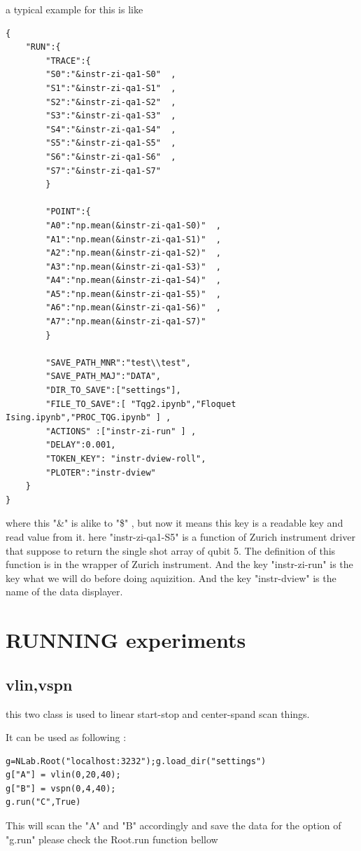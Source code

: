\documentclass{article}
\begin{document}
a typical example for this is like 
\begin{lstlisting}
{
	"RUN":{
		"TRACE":{
        "S0":"&instr-zi-qa1-S0"  ,
        "S1":"&instr-zi-qa1-S1"  ,
        "S2":"&instr-zi-qa1-S2"  ,
        "S3":"&instr-zi-qa1-S3"  ,
        "S4":"&instr-zi-qa1-S4"  ,
        "S5":"&instr-zi-qa1-S5"  ,
        "S6":"&instr-zi-qa1-S6"  ,
        "S7":"&instr-zi-qa1-S7"
		}
   
		"POINT":{
        "A0":"np.mean(&instr-zi-qa1-S0)"  ,
        "A1":"np.mean(&instr-zi-qa1-S1)"  ,
        "A2":"np.mean(&instr-zi-qa1-S2)"  ,
        "A3":"np.mean(&instr-zi-qa1-S3)"  ,
        "A4":"np.mean(&instr-zi-qa1-S4)"  ,
        "A5":"np.mean(&instr-zi-qa1-S5)"  ,
        "A6":"np.mean(&instr-zi-qa1-S6)"  ,
        "A7":"np.mean(&instr-zi-qa1-S7)"
		}

		"SAVE_PATH_MNR":"test\\test",
		"SAVE_PATH_MAJ":"DATA",
		"DIR_TO_SAVE":["settings"],
		"FILE_TO_SAVE":[ "Tqg2.ipynb","Floquet Ising.ipynb","PROC_TQG.ipynb" ] ,
		"ACTIONS" :["instr-zi-run" ] ,
		"DELAY":0.001,
		"TOKEN_KEY": "instr-dview-roll",
		"PLOTER":"instr-dview"
	}
}
\end{lstlisting}
where this "\&"  is alike to "\$" , but now it means 
this key is a readable key and read value from it.
here "instr-zi-qa1-S5" is a function of Zurich instrument driver
that suppose to return the single shot array of qubit 5.
The definition of this function is in the wrapper of Zurich instrument.
And the key "instr-zi-run" is the key what we will do before
doing aquizition.
And the key "instr-dview" is the name of the data displayer.





\section{RUNNING experiments}
\subsection{vlin,vspn}
this two class is used to linear start-stop and center-spand scan things.

It can be used as following : 

\begin{lstlisting}
g=NLab.Root("localhost:3232");g.load_dir("settings")
g["A"] = vlin(0,20,40);
g["B"] = vspn(0,4,40);
g.run("C",True)
\end{lstlisting}
This will scan the "A" and "B" accordingly and save the data
for the option of "g.run" please check the Root.run function bellow
\end{document}
